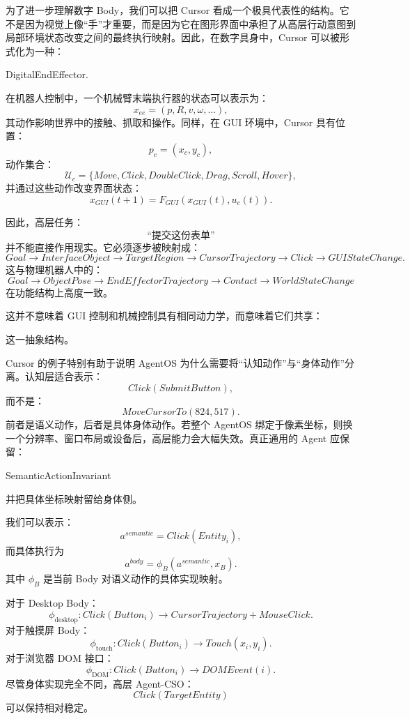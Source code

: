 为了进一步理解数字 Body，我们可以把 Cursor 看成一个极具代表性的结构。它不是因为视觉上像“手”才重要，而是因为它在图形界面中承担了从高层行动意图到局部环境状态改变之间的最终执行映射。因此，在数字具身中，Cursor 可以被形式化为一种：
\begin{statementbox}
DigitalEndEffector.
\end{statementbox}

在机器人控制中，一个机械臂末端执行器的状态可以表示为：
\[
x_{ee}
=
(p,R,v,\omega,\ldots),
\]
其动作影响世界中的接触、抓取和操作。同样，在 GUI 环境中，Cursor 具有位置：
\[
p_c=(x_c,y_c),
\]
动作集合：
\[
\mathcal U_c
=
\{
Move,
Click,
DoubleClick,
Drag,
Scroll,
Hover
\},
\]
并通过这些动作改变界面状态：
\[
x_{GUI}(t+1)
=
F_{GUI}
\left(
x_{GUI}(t),
u_c(t)
\right).
\]

因此，高层任务：
\[
\text{“提交这份表单”}
\]
并不能直接作用现实。它必须逐步被映射成：
\[
Goal
\rightarrow
InterfaceObject
\rightarrow
TargetRegion
\rightarrow
CursorTrajectory
\rightarrow
Click
\rightarrow
GUIStateChange.
\]
这与物理机器人中的：
\[
Goal
\rightarrow
ObjectPose
\rightarrow
EndEffectorTrajectory
\rightarrow
Contact
\rightarrow
WorldStateChange
\]
在功能结构上高度一致。

这并不意味着 GUI 控制和机械控制具有相同动力学，而意味着它们共享：
\begin{statementbox}
\centering
{}
\end{statementbox}
这一抽象结构。

Cursor 的例子特别有助于说明 AgentOS 为什么需要将“认知动作”与“身体动作”分离。认知层适合表示：
\[
Click(
SubmitButton
),
\]
而不是：
\[
MoveCursorTo(824,517).
\]
前者是语义动作，后者是具体身体动作。若整个 AgentOS 绑定于像素坐标，则换一个分辨率、窗口布局或设备后，高层能力会大幅失效。真正通用的 Agent 应保留：
\begin{statementbox}
SemanticActionInvariant
\end{statementbox}
并把具体坐标映射留给身体侧。

我们可以表示：
\[
a^{semantic}
=
Click(Entity_i),
\]
而具体执行为
\[
a^{body}
=
\phi_B
\left(
a^{semantic},
x_B
\right).
\]
其中 $\phi_B$ 是当前 Body 对语义动作的具体实现映射。

对于 Desktop Body：
\[
\phi_{\mathrm{desktop}}
:
Click(Button_i)
\rightarrow
CursorTrajectory+MouseClick.
\]
对于触摸屏 Body：
\[
\phi_{\mathrm{touch}}
:
Click(Button_i)
\rightarrow
Touch(x_i,y_i).
\]
对于浏览器 DOM 接口：
\[
\phi_{\mathrm{DOM}}
:
Click(Button_i)
\rightarrow
DOMEvent(i).
\]
尽管身体实现完全不同，高层 Agent-CSO：
\[
\boxed{
Click(TargetEntity)
}
\]
可以保持相对稳定。

